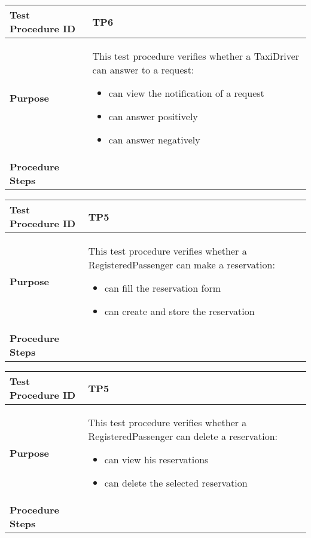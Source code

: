 			\begin{tabular}{p{4cm} | p{8cm}} \hline
				\textbf{Test Procedure ID} & TP6 \\ \hline
				\textbf{Purpose} & This test procedure verifies whether a TaxiDriver can answer to a request:
				\begin{itemize}
					\item can view the notification of a request
					\item can answer positively
					\item can answer negatively
				\end{itemize}
				\\ \hline
				\textbf{Procedure Steps} &  \\ \hline
			\end{tabular}
			\begin{tabular}{p{4cm} | p{8cm}} \hline
				\textbf{Test Procedure ID} & TP5 \\ \hline
				\textbf{Purpose} & This test procedure verifies whether a RegisteredPassenger can make a reservation:
				\begin{itemize}
					\item can fill the reservation form
					\item can create and store the reservation
				\end{itemize}
				\\ \hline
				\textbf{Procedure Steps} &  \\ \hline
			\end{tabular}
			\begin{tabular}{p{4cm} | p{8cm}} \hline
				\textbf{Test Procedure ID} & TP5 \\ \hline
				\textbf{Purpose} & This test procedure verifies whether a RegisteredPassenger can delete a reservation:
				\begin{itemize}
					\item can view his reservations
					\item can delete the selected reservation
				\end{itemize}
				\\ \hline
				\textbf{Procedure Steps} &  \\ \hline
			\end{tabular}